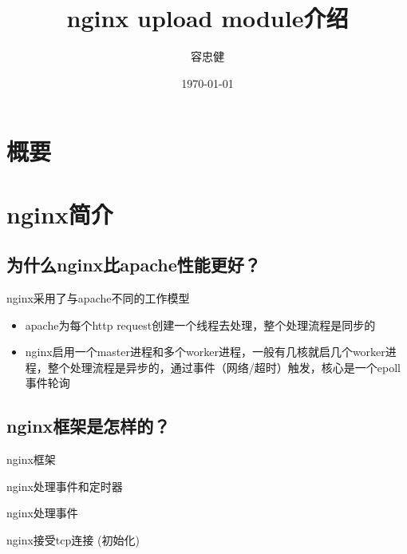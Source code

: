 \documentclass[aspectratio=169]{ctexbeamer}
\title{nginx upload module介绍}
\author{容忠健}
\institute{@Bigo}
\date{\today}
\begin{document}
\frame[plain]{\titlepage}

\section*{概要}
\begin{frame}
  \tableofcontents[hideallsubsections]
\end{frame}

\section{nginx简介}

\subsection{为什么nginx比apache性能更好？}
\begin{frame}{\subsecname}{nginx采用了与apache不同的工作模型}
  \begin{itemize}
  \item<2-> apache为每个http request创建一个线程去处理，整个处理流程是同步的
  \item<3-> nginx启用一个master进程和多个worker进程，一般有几核就启几个worker进程，整个处理流程是异步的，通过事件（网络/超时）触发，核心是一个epoll事件轮询
  \end{itemize}
\end{frame}

\subsection{nginx框架是怎样的？}
\begin{frame}{\subsecname}{nginx框架}
  
\end{frame}

\begin{frame}{\subsecname}{nginx处理事件和定时器}
  
\end{frame}

\begin{frame}{\subsecname}{nginx处理事件}
  
\end{frame}

\begin{frame}{\subsecname}{nginx接受tcp连接 (初始化)}
  
\end{frame}
\end{document}
